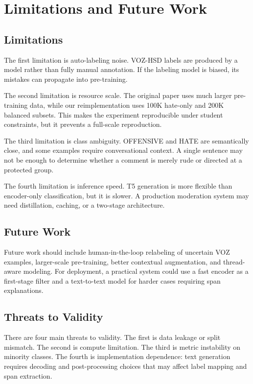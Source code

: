 \documentclass[journal]{IEEEtran}
\begin{document}
\section{Limitations and Future Work}
\subsection{Limitations}
The first limitation is auto-labeling noise. VOZ-HSD labels are produced by a model rather than fully manual annotation. If the labeling model is biased, its mistakes can propagate into pre-training.

The second limitation is resource scale. The original paper uses much larger pre-training data, while our reimplementation uses 100K hate-only and 200K balanced subsets. This makes the experiment reproducible under student constraints, but it prevents a full-scale reproduction.

The third limitation is class ambiguity. OFFENSIVE and HATE are semantically close, and some examples require conversational context. A single sentence may not be enough to determine whether a comment is merely rude or directed at a protected group.

The fourth limitation is inference speed. T5 generation is more flexible than encoder-only classification, but it is slower. A production moderation system may need distillation, caching, or a two-stage architecture.

\subsection{Future Work}
Future work should include human-in-the-loop relabeling of uncertain VOZ examples, larger-scale pre-training, better contextual augmentation, and thread-aware modeling. For deployment, a practical system could use a fast encoder as a first-stage filter and a text-to-text model for harder cases requiring span explanations.

\subsection{Threats to Validity}
There are four main threats to validity. The first is data leakage or split mismatch. The second is compute limitation. The third is metric instability on minority classes. The fourth is implementation dependence: text generation requires decoding and post-processing choices that may affect label mapping and span extraction.
\end{document}
